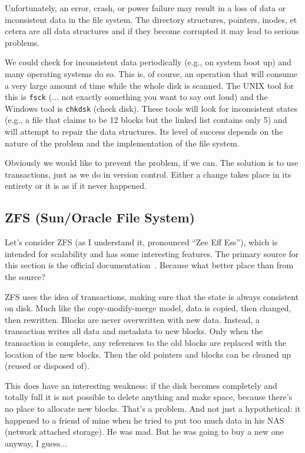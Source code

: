 Unfortunately, an error, crash, or power failure may result in a loss of data or inconsistent data in the file system. The directory structures, pointers, inodes, et cetera are all data structures and if they become corrupted it may lead to serious problems.

We could check for inconsistent data periodically (e.g., on system boot up) and many operating systems do so. This is, of course, an operation that will consume a very large amount of time while the whole disk is scanned. The UNIX tool for this is \texttt{fsck} (... not exactly something you want to say out loud) and the Windows tool is \texttt{chkdsk} (check disk). These tools will look for inconsistent states (e.g., a file that claims to be 12 blocks but the linked list contains only 5) and will attempt to repair the data structures. Its level of success depends on the nature of the problem and the implementation of the file system.

Obviously we would like to prevent the problem, if we can. The solution is to use transactions, just as we do in version control. Either a change takes place in its entirety or it is as if it never happened.


\subsection*{ZFS (Sun/Oracle File System)}
Let's consider ZFS (as I understand it, pronounced ``Zee Eff Ess''), which is intended for scalability and has some interesting features. The primary source for this section is the official documentation~\cite{zfs}. Because what better place than from the source?

ZFS uses the idea of transactions, making sure that the state is always consistent on disk. Much like the copy-modify-merge model, data is copied, then changed, then rewritten. Blocks are never overwritten with new data. Instead, a transaction writes all data and metadata to new blocks. Only when the transaction is complete, any references to the old blocks are replaced with the location of the new blocks. Then the old pointers and blocks can be cleaned up (reused or disposed of).

This does have an interesting weakness: if the disk becomes completely and totally full it is not possible to delete anything and make space, because there's no place to allocate new blocks. That's a problem. And not just a hypothetical: it happened to a friend of mine when he tried to put too much data in his NAS (network attached storage). He was mad. But he was going to buy a new one anyway, I guess...

